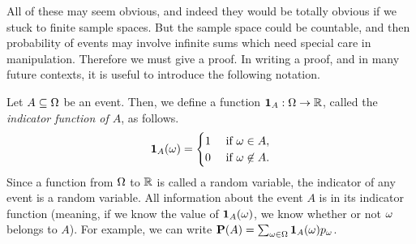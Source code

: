 \documentclass[preprint,  11pt]{amsart}
\renewcommand{\benu}{\begin{enumerate}\setlength\itemsep{6pt}}
\begin{document}
All of these may seem obvious, and indeed they would be totally obvious if we stuck to finite sample spaces. But the sample space could be countable, and then probability of events may involve infinite sums which need special care in manipulation. Therefore we must give a proof. In writing a proof, and in many future contexts, it is useful to introduce the following notation.

 Let $A\subseteq \Omega$ be an event. Then, we define a function ${\mathbf 1}_{A}:\Omega\rightarrow \mathbb{R}$, called the {\em indicator function of $A$},  as follows.
$$
{\mathbf 1}_{A}(\omega) = \begin{cases}
1 & \mbox{ if }\omega\in A,\\
0 & \mbox{ if }\omega\not\in A.
\end{cases}
$$ 
Since a function from $\Omega$ to $\mathbb{R}$ is called a random variable, the indicator of any event is a random variable. All information about the event $A$ is in its indicator function (meaning, if we know the value of ${\mathbf 1}_{A}(\omega)$, we know whether or not $\omega$ belongs to $A$). For example, we can write $\mathbf{P}(A)=\sum_{\omega\in \Omega}{\mathbf 1}_{A}(\omega)p_{\omega}$.
\end{document}
